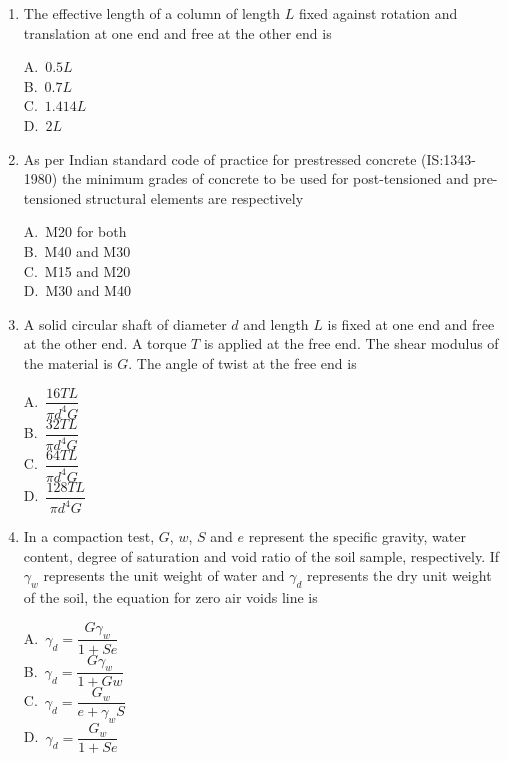 \documentclass[journal,12pt,onecolumn]{IEEEtran}
\theoremstyle{remark}
\begin{document}
\begin{enumerate}
\noindent\item The effective length of a column of length $L$ fixed against rotation and translation at one end and free at the other end is \hfill{}
\begin{multicols}{4}
A.\ $0.5L$ \\
B.\ $0.7L$ \\
C.\ $1.414L$ \\
D.\ $2L$
\end{multicols}

\raggedright
\noindent\item As per Indian standard code of practice for prestressed concrete (IS:1343-1980) the minimum grades of concrete to be used for post-tensioned and pre-tensioned structural elements are respectively 
\hfill{}
\begin{multicols}{4}
A.\ M20 for both \\
B.\ M40 and M30 \\
C.\ M15 and M20 \\
D.\ M30 and M40
\end{multicols}

\noindent\item A solid circular shaft of diameter $d$ and length $L$ is fixed at one end and free at the other end. A torque $T$ is applied at the free end. The shear modulus of the material is $G$. The angle of twist at the free end is 
\hfill{}
\begin{multicols}{4}
A.\ $\dfrac{16TL}{\pi d^4 G}$ \\
B.\ $\dfrac{32TL}{\pi d^4 G}$ \\
C.\ $\dfrac{64TL}{\pi d^4 G}$ \\
D.\ $\dfrac{128TL}{\pi d^4 G}$
\end{multicols}

\noindent\item In a compaction test, $G$, $w$, $S$ and $e$ represent the specific gravity, water content, degree of saturation and void ratio of the soil sample, respectively. If $\gamma_w$ represents the unit weight of water and $\gamma_d$ represents the dry unit weight of the soil, the equation for zero air voids line is 
\\ \hfill{}
\begin{multicols}{4}
A.\ $\gamma_d = \dfrac{G \gamma_w}{1+Se}$ \\
B.\ $\gamma_d = \dfrac{G \gamma_w}{1+Gw}$ \\
C.\ $\gamma_d = \dfrac{G_w}{e+\gamma_w S}$ \\
D.\ $\gamma_d = \dfrac{G_w}{1+Se}$
\end{multicols}


\end{enumerate}
\end{document}
